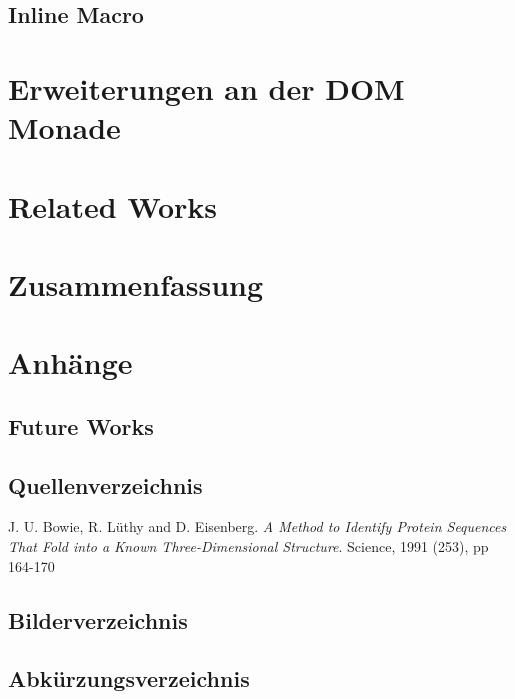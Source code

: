 \documentclass[12pt]{scrreprt}
\begin{document}
\section{Inline Macro}
\label{sec:inline-macro}

\chapter{Erweiterungen an der DOM Monade}
\label{chap:dom-monad-extensions}

\chapter{Related Works}
\label{chap:related-works}

\chapter{Zusammenfassung}
\label{chap:summary}

\chapter{Anhänge}
\label{chap:anhänge}

\section{Future Works}
\label{sec:future-works}

\section{Quellenverzeichnis}

\begin{thebibliography}{------}
\label{sec:bib}
	J. U. Bowie, R. L\"uthy and D. Eisenberg.
	{\em A Method to Identify Protein Sequences That Fold 
	into a Known Three-Dimensional Structure}.
	Science, 1991 (253), pp 164-170
\end{thebibliography}

\section{Bilderverzeichnis}


\section{Abkürzungsverzeichnis}
\end{document}
